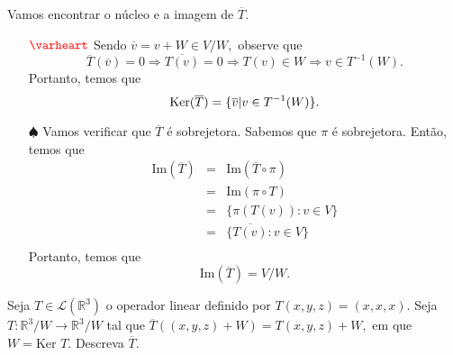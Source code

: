 \documentclass[11pt,a4paper]{article}
\begin{document}
{{    Vamos encontrar o núcleo e a imagem de $\overline{T}.$
    \begin{itemize}
        \item[$\textcolor{red}{\varheart}$] Sendo $\overline{v} = v + W \in V/W,$ observe que
        \[
        \overline{T}(\overline{v}) = 0 \Rightarrow \overline{T(v)}=0 \Rightarrow T(v) \in W \Rightarrow v \in T^{-1}(W).
        \]
        Portanto, temos que
        \[
        {\rm Ker}(\overline{T}) = \{ \overline{v} | v \in T^{-1}(W) \}.
        \]
        
     \item[$\spadesuit$] Vamos verificar que $\overline{T}$ é sobrejetora. Sabemos que $\pi$ é sobrejetora. Então, temos que
     \[
     \begin{array}{lcr}
     \mbox{Im}(\overline{T}) &=&    \mbox{Im}(\overline{T} \circ \pi) \\
     &=&    \mbox{Im}(\pi \circ T) \\
     &=&    \{ \pi(T(v)) : v \in V \} \\
     &=&    \{ \overline{T(v)} : v \in V \} \\
     \end{array}
     \]
     Portanto, temos que
     \[
     \mbox{Im}(\overline{T}) = V/W.
     \]
    \end{itemize}

}
    }

 Seja $T \in \mathcal{L}(\mathbb{R}^3)$ o operador linear definido por $T(x, y, z) = (x, x, x).$ Seja $T \colon \mathbb{R}^3/W \to \mathbb{R}^3/W$
tal que $\overline{T}((x, y, z) + W) = T(x, y, z) + W,$ em que $W = \mbox{Ker } T.$ Descreva $\overline{T}.$
\end{document}
